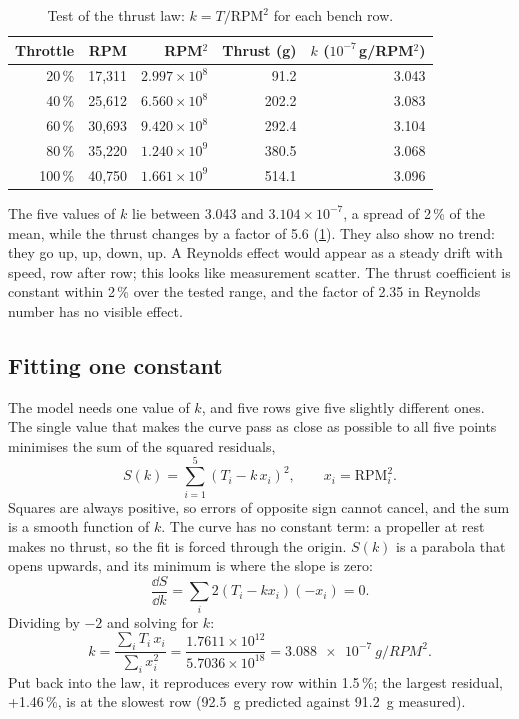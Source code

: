\begin{table}[htbp]
\centering\small
\caption{Test of the thrust law: $k = T/\text{RPM}^2$ for each bench row.}\label{tab:sizing-ktest}
\begin{tabular}{@{}rrrrr@{}}
\toprule
Throttle & RPM & RPM$^2$ & Thrust (g) & $k$ ($10^{-7}$\,g/RPM$^2$)\\
\midrule
20\,\% & 17,311 & $2.997\times10^{8}$ & 91.2 & 3.043\\
40\,\% & 25,612 & $6.560\times10^{8}$ & 202.2 & 3.083\\
60\,\% & 30,693 & $9.420\times10^{8}$ & 292.4 & 3.104\\
80\,\% & 35,220 & $1.240\times10^{9}$ & 380.5 & 3.068\\
100\,\% & 40,750 & $1.661\times10^{9}$ & 514.1 & 3.096\\
\bottomrule
\end{tabular}
\end{table}

The five values of $k$ lie between 3.043 and $3.104\times10^{-7}$, a spread of 2\,\% of the mean, while the thrust changes by a factor of 5.6 (\cref{tab:sizing-ktest}). They also show no trend: they go up, up, down, up. A Reynolds effect would appear as a steady drift with speed, row after row; this looks like measurement scatter. The thrust coefficient is constant within 2\,\% over the tested range, and the factor of 2.35 in Reynolds number has no visible effect.

\subsection{Fitting one constant}

The model needs one value of $k$, and five rows give five slightly different ones. The single value that makes the curve pass as close as possible to all five points minimises the sum of the squared residuals,
\begin{equation}
S(k) = \sum_{i=1}^{5} \left(T_i - k\, x_i\right)^2, \qquad x_i = \text{RPM}_i^2.
\end{equation}
Squares are always positive, so errors of opposite sign cannot cancel, and the sum is a smooth function of $k$. The curve has no constant term: a propeller at rest makes no thrust, so the fit is forced through the origin. $S(k)$ is a parabola that opens upwards, and its minimum is where the slope is zero:
\begin{equation}
\frac{\dd S}{\dd k} = \sum_i 2\left(T_i - k x_i\right)(-x_i) = 0.
\end{equation}
Dividing by $-2$ and solving for $k$:
\begin{equation}
k = \frac{\sum_i T_i\, x_i}{\sum_i x_i^2} = \frac{1.7611\times10^{12}}{5.7036\times10^{18}} = \SI{3.088e-7}{g/RPM^2}.
\end{equation}
Put back into the law, it reproduces every row within 1.5\,\%; the largest residual, +1.46\,\%, is at the slowest row (\SI{92.5}{g} predicted against \SI{91.2}{g} measured).

